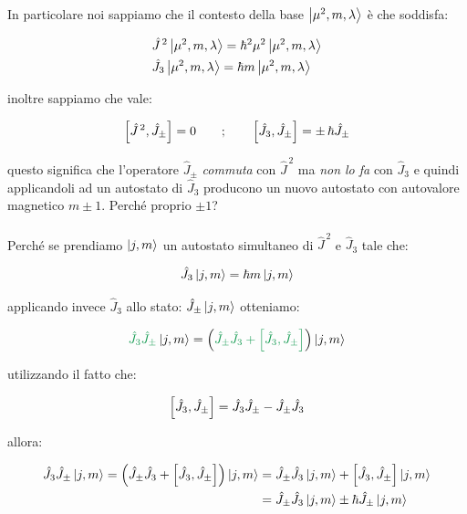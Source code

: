 \begin{myprf}

	In particolare noi sappiamo che il contesto della base $\ket{\mu^2, m, \lambda}$ è che soddisfa:
	
\begin{align*}
	& \hat{J}^{\, 2}\ket{\mu^2, m, \lambda}  = \hbar^2 \mu^2 \ket{\mu^2, m, \lambda} \\
	& \hat{J}_3 \ket{\mu^2, m, \lambda} = \hbar m \ket{\mu^2, m, \lambda}
\end{align*}

	inoltre sappiamo che vale:
	
\begin{align*}
	\qty[\hat{J}^{\, 2}, \hat{J}_{\pm}] = 0 \qquad ; \qquad \qty[\hat{J}_3, \hat{J}_{\pm}] = \pm \, \hbar \hat{J}_{\pm}
\end{align*}

	questo significa che l'operatore $\hat{J}_{\pm}$ \textit{commuta} con $\hat{J}^{\, 2}$ ma \textit{non lo fa} con $\hat{J}_3$ e quindi applicandoli ad un autostato di $\hat{J}_3$ producono un nuovo autostato con autovalore magnetico $m \pm 1$. Perché proprio $\pm1$?
	\\
	\\
	Perché se prendiamo $\ket{j, m}$ un autostato simultaneo di $\hat{J}^{\, 2}$ e $\hat{J}_3$ tale che:

\begin{align*}
	\hat{J}_3 \ket{j, m} = \hbar m \ket{j, m}
\end{align*}

	applicando invece $\hat{J}_3$ allo stato: $\hat{J}_{\pm} \ket{j, m}$ otteniamo:

\begin{align*}
	\textcolor{ForestGreen}{\hat{J}_3 \hat{J}_{\pm}} \ket{j, m} = \qty(\textcolor{ForestGreen}{ \hat{J}_{\pm} \hat{J}_{3}  + \qty[\hat{J}_3, \hat{J}_{\pm}] }) \ket{j, m}
\end{align*}

	utilizzando il fatto che:
	
\begin{align*}
	\qty[\hat{J}_3, \hat{J}_{\pm}]  = \hat{J}_3 \hat{J}_{\pm} -  \hat{J}_{\pm} \hat{J}_{3} 
\end{align*}

	allora:
	
\begin{align*}
	\hat{J}_3 \hat{J}_{\pm} \ket{j, m} = \qty(\hat{J}_{\pm} \hat{J}_{3}  + \qty[\hat{J}_3, \hat{J}_{\pm}] ) \ket{j, m} & =   \hat{J}_{\pm} \hat{J}_{3} \ket{j, m} + \qty[\hat{J}_3, \hat{J}_{\pm}] \ket{j, m} \\
	& = \hat{J}_{\pm} \hat{J}_{3} \ket{j, m} \pm \hbar \hat{J}_{\pm} \ket{j, m} 
\end{align*}


\end{myprf}
